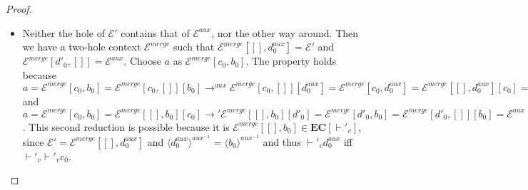 \begin{proof}
\begin{itemize}
\item Neither the hole of $\mathcal{E}'$ contains that of $\mathcal{E}^{aux}$, nor the other way around. Then we have a two-hole context $\mathcal{E}^{merge}$ such that $\mathcal{E}^{merge}[[], d^{aux}_0] = \mathcal{E}'$ and $\mathcal{E}^{merge}[d'_0, []] = \mathcal{E}^{aux}$. Choose $a$ as $\mathcal{E}^{merge}[c_0, b_0]$. The property holds because $a = \mathcal{E}^{merge}[c_0, b_0] = \mathcal{E}^{merge}[c_0, []][b_0] \longrightarrow^{aux} \mathcal{E}^{merge}[c_0, []][d^{aux}_0] = \mathcal{E}^{merge}[c_0, d^{aux}_0] = \mathcal{E}^{merge}[[], d^{aux}_0][c_0] = \mathcal{E}'[c_0] = c$ and $a = \mathcal{E}^{merge}[c_0, b_0] = \mathcal{E}^{merge}[[], b_0][c_0] \longrightarrow' \mathcal{E}^{merge}[[], b_0][d'_0] = \mathcal{E}^{merge}[d'_0, b_0] = \mathcal{E}^{merge}[d'_0, []][b_0] = \mathcal{E}^{aux}[b_0] = b$. This second reduction is possible because it is $\mathcal{E}^{merge}[[], b_0] \in \mathbf{EC}[\vdash'_v]$, since $\mathcal{E}' = \mathcal{E}^{merge}[[], d^{aux}_0]$ and $\langle d^{aux}_0 \rangle^{aux^{-1}} = \langle b_0 \rangle^{aux^{-1}}$ and thus $\vdash'_v d^{aux}_0$ iff $\vdash'_v \vdash'_v c_0$.
\end{itemize}

\end{proof}

\clearpage
\newpage
